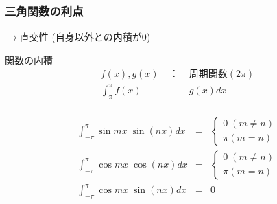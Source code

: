 \documentclass[a4paper]{jsarticle}
\begin{document}
\subsubsection{三角関数の利点}
$\rightarrow$直交性 (自身以外との内積が0)
\begin{itembox}[l]{関数の内積}
    \begin{eqnarray*}
        f\left(x\right),g\left(x\right)&\;：\;&周期関数 \left(2\pi\right)\\
        \int^\pi_{\pi}f\left(x\right)&&g\left(x\right) dx\\
    \end{eqnarray*}
\end{itembox}
\begin{eqnarray*}
    \int^\pi_{-\pi}\sin mx \;\sin\left(nx\right)dx &=&
    \begin{cases}
        0 \;\left(m\neq n\right) \\
        \pi \left(m=n\right)
    \end{cases}\\
    \int^\pi_{-\pi}\cos mx \;\cos\left(nx\right)dx &=&
    \begin{cases}
        0 \;\left(m\neq n\right) \\
        \pi \left(m=n\right)
    \end{cases}\\
    \int^\pi_{-\pi}\cos mx \;\sin\left(nx\right)dx &=&0\\
\end{eqnarray*}
\end{document}
